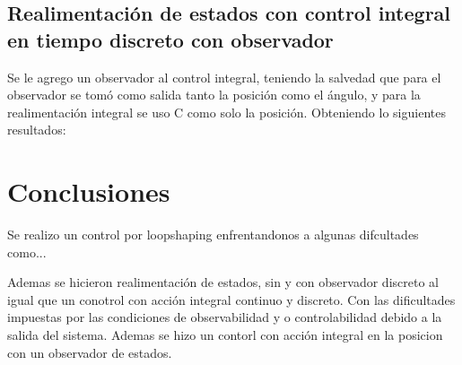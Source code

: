 \subsection{Realimentaci\'on de estados con control integral en tiempo discreto con observador}
Se le agrego un observador al control integral, teniendo la salvedad que para el observador se tom\'o como salida tanto la posici\'on como el \'angulo, y para la realimentaci\'on integral se uso C como solo la posici\'on. Obteniendo lo siguientes resultados:

\section{Conclusiones}
Se realizo un control por loopshaping enfrentandonos a algunas difcultades como...



Ademas se hicieron realimentación de estados, sin y con observador discreto al igual que un conotrol con acción integral continuo y discreto.
Con las dificultades impuestas por las condiciones de observabilidad y o controlabilidad debido a la salida del sistema.
Ademas se hizo un contorl con acción integral en la posicion con un observador de estados.

